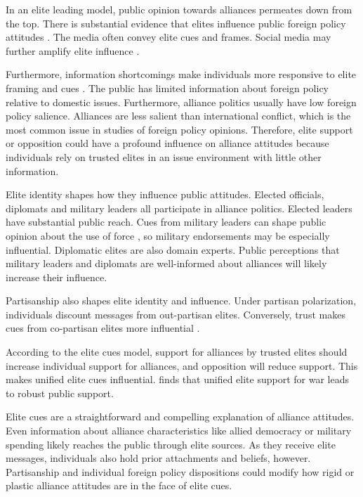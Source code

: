 \documentclass[12pt]{article}
\begin{document}
In an elite leading model, public opinion towards alliances permeates down from the top.
There is substantial evidence that elites influence public foreign policy attitudes \citep{BaumPotter2008}. 
The media often convey elite cues and frames.
Social media may further amplify elite influence \citep{BaumPotter2019}.   


Furthermore, information shortcomings make individuals more responsive to elite framing and cues \citep{Druckman2001, Peterson2017}.  
The public has limited information about foreign policy relative to domestic issues.
Furthermore, alliance politics usually have low foreign policy salience. 
Alliances are less salient than international conflict, which is the most common issue in studies of foreign policy opinions. 
Therefore, elite support or opposition could have a profound influence on alliance attitudes because individuals rely on trusted elites in an issue environment with little other information. 


Elite identity shapes how they influence public attitudes.
Elected officials, diplomats and military leaders all participate in alliance politics.
Elected leaders have substantial public reach.  
Cues from military leaders can shape public opinion about the use of force \citep{Golbyetal2018}, so military endorsements may be especially influential. 
Diplomatic elites are also domain experts. 
Public perceptions that military leaders and diplomats are well-informed about alliances will likely increase their influence. 


Partisanship also shapes elite identity and influence.
Under partisan polarization, individuals discount messages from out-partisan elites. 
Conversely, trust makes cues from co-partisan elites more influential \citep{Druckmanetal2013}. 


According to the elite cues model, support for alliances by trusted elites should increase individual support for alliances, and opposition will reduce support.  
This makes unified elite cues influential.
\citet{Berinsky2007} finds that unified elite support for war leads to robust public support. 


Elite cues are a straightforward and compelling explanation of alliance attitudes.
Even information about alliance characteristics like allied democracy or military spending likely reaches the public through elite sources. 
As they receive elite messages, individuals also hold prior attachments and beliefs, however.
Partisanship and individual foreign policy dispositions could modify how rigid or plastic alliance attitudes are in the face of elite cues. 
\end{document}
